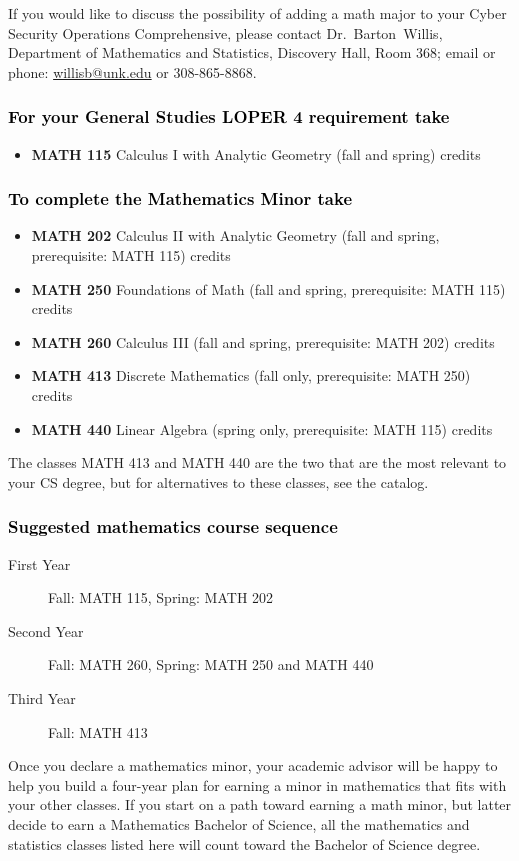\documentclass[10pt]{article}
\makeatletter
\newenvironment{mypar}[2]
   {\begin{list}{}%
     {\setlength\leftmargin{#1}
     \setlength\rightmargin{#2}}
     \item[]}
   {\end{list}}
\newcommand{\calcone}{\textbf{MATH 115} Calculus I with Analytic Geometry (fall and spring) \dotfill 5 credits}
\newcommand{\calctwo}{\textbf{MATH 202} Calculus II with Analytic Geometry (fall and spring, prerequisite: MATH 115) \dotfill 5 credits }
\newcommand{\foundations}{\textbf{MATH 250} Foundations of Math (fall and spring, prerequisite: MATH 115)  \dotfill 3 credits}
\newcommand{\calcthree}{\textbf{MATH 260} Calculus III  (fall and spring, prerequisite: MATH 202) \dotfill 5 credits}
\newcommand{\linear}{\textbf{MATH 440} Linear Algebra (spring only, prerequisite: MATH 115) \dotfill 3 credits}
\newcommand{\discrete}{\textbf{MATH 413} Discrete Mathematics  (fall only, prerequisite: MATH 250)\dotfill 3 credits}
\newcommand{\contactbw}{\mbox{Dr.\ Barton Willis}, Department of Mathematics and Statistics,  Discovery Hall, Room 368;
email or phone: \href{mailto:willisb@unk.edu}{willisb@unk.edu} or 308-865-8868.}
\newcommand{\forinfo}[2]{If you would like to discuss the possibility of adding a math {#1} to your {#2}, please contact \contactbw}
\makeatother
\begin{document}
 
 \forinfo{major}{Cyber Security Operations Comprehensive}


\vspace{-0.1in}

\subsubsection*{\textcolor{black}{For  your General Studies LOPER 4 requirement take}}
\begin{itemize}
\item  \calcone
\end{itemize}

\subsubsection*{\textcolor{black}{To complete the Mathematics Minor take}}

\begin{itemize}
\item \calctwo
\item \foundations
\item \calcthree
\item \discrete
\item \linear
\end{itemize}
\begin{mypar}{0.5cm}{0.5cm}{The classes MATH 413 and MATH 440 are the two that are the most relevant to your  CS degree, but for alternatives to these classes, see the catalog.} \end{mypar}

\vspace{-0.1in}
\subsubsection*{\textcolor{black}{Suggested mathematics course sequence}}

\begin{description}
   \item[\phantom{xxx} First Year] Fall: MATH 115, Spring:  MATH 202
      \item[\phantom{xxx} Second Year]  Fall: MATH 260,  Spring: MATH 250  and MATH 440
     \item[\phantom{xxx} Third Year]  Fall: MATH 413
 \end{description}
 
 \vspace{0.1in}
\noindent Once you declare a mathematics minor, your academic advisor will be happy to help you build a four-year plan for earning a minor in mathematics that fits with your other classes.  If you start on a path toward earning a math minor, but latter decide to earn a  Mathematics Bachelor of Science, all the mathematics and statistics  classes listed here will count toward the Bachelor of Science degree.
\end{document}
